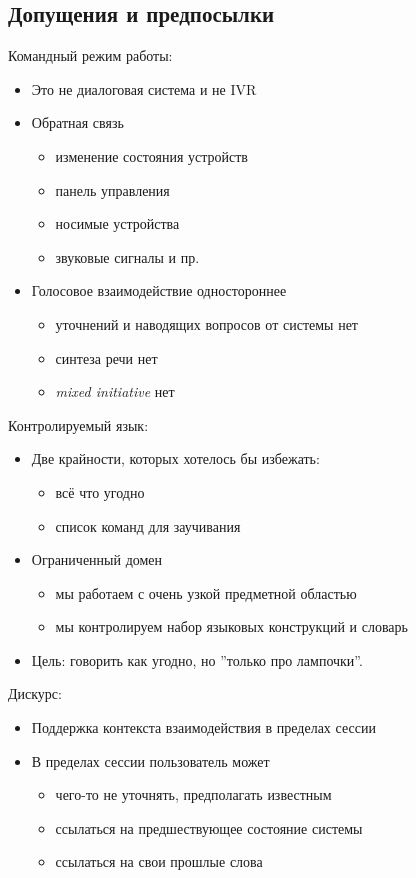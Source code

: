 \documentclass[a4paper,12pt]{article}
\begin{document}
\subsection{Допущения и предпосылки}
Командный режим работы:
\begin{itemize}
	\item Это не диалоговая система и не IVR
	\item Обратная связь
		\begin{itemize}
			\item изменение состояния устройств 
			\item панель управления
			\item носимые устройства 
			\item звуковые сигналы и пр.
		\end{itemize}
	\item Голосовое взаимодействие одностороннее
		\begin{itemize}
			\item уточнений и наводящих вопросов от системы нет
			\item синтеза речи нет
			\item \textit{mixed initiative} нет
		\end{itemize}
\end{itemize}

Контролируемый язык:\\
\begin{itemize}
	\item Две крайности, которых хотелось бы избежать:
		\begin{itemize}
			\item всё что угодно 
			\item список команд для заучивания
		\end{itemize}
	\item Ограниченный домен
		\begin{itemize}
			\item мы работаем с очень узкой предметной областью
			\item мы контролируем набор языковых конструкций и словарь
		\end{itemize}
	\item Цель: говорить как угодно, но ''только про лампочки''.
\end{itemize}

Дискурс:\\
\begin{itemize}
	\item Поддержка контекста взаимодействия в пределах сессии 
	\item В пределах сессии пользователь может
		\begin{itemize}
			\item чего-то не уточнять, предполагать известным
			\item ссылаться на предшествующее состояние системы
			\item ссылаться на свои прошлые слова
		\end{itemize}
\end{itemize}
\end{document}
